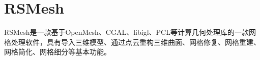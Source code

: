 \chapter{RSMesh}
\hypertarget{md__r_e_a_d_m_e}{}\label{md__r_e_a_d_m_e}
\label{md__r_e_a_d_m_e_autotoc_md0}%
%


RSMesh是一款基于\+Open\+Mesh、\+CGAL、libigl、\+PCL等计算几何处理库的一款网格处理软件，具有导入三维模型、通过点云重构三维曲面、网格修复、网格重建、网格简化、网格细分等基本功能。 